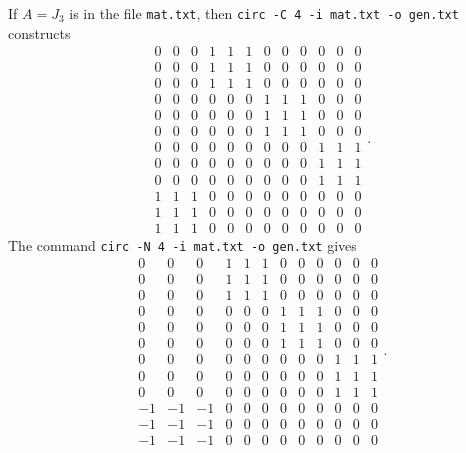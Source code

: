 \documentclass[a4paper,10pt]{article}
\begin{document}
If $A = J_3$ is in the file {\tt mat.txt}, then {\tt circ -C 4 -i mat.txt -o gen.txt} constructs
\[
 \begin{array}{rrrrrrrrrrrr}
0 & 0 & 0 & 1 & 1 & 1 & 0 & 0 & 0 & 0 & 0 & 0 \\
0 & 0 & 0 & 1 & 1 & 1 & 0 & 0 & 0 & 0 & 0 & 0 \\
0 & 0 & 0 & 1 & 1 & 1 & 0 & 0 & 0 & 0 & 0 & 0 \\
0 & 0 & 0 & 0 & 0 & 0 & 1 & 1 & 1 & 0 & 0 & 0 \\
0 & 0 & 0 & 0 & 0 & 0 & 1 & 1 & 1 & 0 & 0 & 0 \\
0 & 0 & 0 & 0 & 0 & 0 & 1 & 1 & 1 & 0 & 0 & 0 \\
0 & 0 & 0 & 0 & 0 & 0 & 0 & 0 & 0 & 1 & 1 & 1 \\
0 & 0 & 0 & 0 & 0 & 0 & 0 & 0 & 0 & 1 & 1 & 1 \\
0 & 0 & 0 & 0 & 0 & 0 & 0 & 0 & 0 & 1 & 1 & 1 \\
1 & 1 & 1 & 0 & 0 & 0 & 0 & 0 & 0 & 0 & 0 & 0 \\
1 & 1 & 1 & 0 & 0 & 0 & 0 & 0 & 0 & 0 & 0 & 0 \\
1 & 1 & 1 & 0 & 0 & 0 & 0 & 0 & 0 & 0 & 0 & 0
\end{array}.
\]
The command {\tt circ -N 4 -i mat.txt -o gen.txt} gives
\[
\begin{array}{rrrrrrrrrrrr}
0 & 0 & 0 & 1 & 1 & 1 & 0 & 0 & 0 & 0 & 0 & 0 \\
0 & 0 & 0 & 1 & 1 & 1 & 0 & 0 & 0 & 0 & 0 & 0 \\
0 & 0 & 0 & 1 & 1 & 1 & 0 & 0 & 0 & 0 & 0 & 0 \\
0 & 0 & 0 & 0 & 0 & 0 & 1 & 1 & 1 & 0 & 0 & 0 \\
0 & 0 & 0 & 0 & 0 & 0 & 1 & 1 & 1 & 0 & 0 & 0 \\
0 & 0 & 0 & 0 & 0 & 0 & 1 & 1 & 1 & 0 & 0 & 0 \\
0 & 0 & 0 & 0 & 0 & 0 & 0 & 0 & 0 & 1 & 1 & 1 \\
0 & 0 & 0 & 0 & 0 & 0 & 0 & 0 & 0 & 1 & 1 & 1 \\
0 & 0 & 0 & 0 & 0 & 0 & 0 & 0 & 0 & 1 & 1 & 1 \\
-1 & -1 & -1 & 0 & 0 & 0 & 0 & 0 & 0 & 0 & 0 & 0 \\
-1 & -1 & -1 & 0 & 0 & 0 & 0 & 0 & 0 & 0 & 0 & 0 \\
-1 & -1 & -1 & 0 & 0 & 0 & 0 & 0 & 0 & 0 & 0 & 0
\end{array}.
\]
\end{document}
